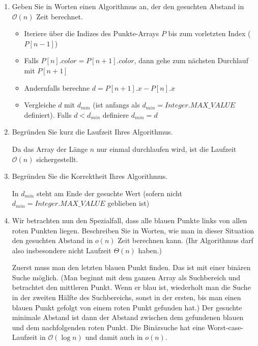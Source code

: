 \documentclass{lehramt-informatik-aufgabe}
\begin{document}
\begin{enumerate}


\item Geben Sie in Worten einen Algorithmus an, der den gesuchten
Abstand in $\mathcal{O}(n)$ Zeit berechnet.

\begin{liAntwort}
\begin{itemize}
\item Iteriere über die Indizes des Punkte-Arrays $P$ bis zum vorletzten
Index ($P[n-1]$)

\item Falls $P[n].color = P[n + 1].color$, dann gehe zum nächsten
Durchlauf mit $P[n + 1]$

\item Andernfalls berechne $d = P[n + 1].x - P[n].x$

\item Vergleiche $d$ mit $d_{min}$ (ist anfangs als $d_{min} =
Integer.MAX\_VALUE$ definiert). Falls $d < d_{min}$ definiere $d_{min} =
d$
\end{itemize}
\end{liAntwort}


\item Begründen Sie kurz die Laufzeit Ihres Algorithmus.

\begin{liAntwort}
Da das Array der Länge $n$ nur einmal durchlaufen wird, ist die Laufzeit
$\mathcal{O}(n)$ sichergestellt.
\end{liAntwort}


\item Begründen Sie die Korrektheit Ihres Algorithmus.

\begin{liAntwort}
In $d_{min}$ steht am Ende der gesuchte Wert (sofern nicht $d_{min} =
Integer.MAX\_VALUE$ geblieben ist)
\end{liAntwort}


\item Wir betrachten nun den Spezialfall, dass alle blauen Punkte links
von allen roten Punkten liegen. Beschreiben Sie in Worten, wie man in
dieser Situation den gesuchten Abstand in $o(n)$ Zeit berechnen kann. (Ihr
Algorithmus darf also insbesondere nicht Laufzeit $\Theta(n)$ haben.)

\begin{liAntwort}
Zuerst muss man den letzten blauen Punkt finden. Das ist mit einer
binären Suche möglich. (Man beginnt mit dem ganzen Array als Suchbereich
und betrachtet den mittleren Punkt. Wenn er blau ist, wiederholt man die
Suche in der zweiten Hälfte des Suchbereichs, sonst in der ersten, bis
man einen blauen Punkt gefolgt von einem roten Punkt gefunden hat.) Der
gesuchte minimale Abstand ist dann der Abstand zwischen dem gefundenen
blauen und dem nachfolgenden roten Punkt. Die Binärsuche hat eine
Worst-case-Laufzeit in $\mathcal{O}(\log n)$ und damit auch in $o(n)$.
\end{liAntwort}

\end{enumerate}
\end{document}
